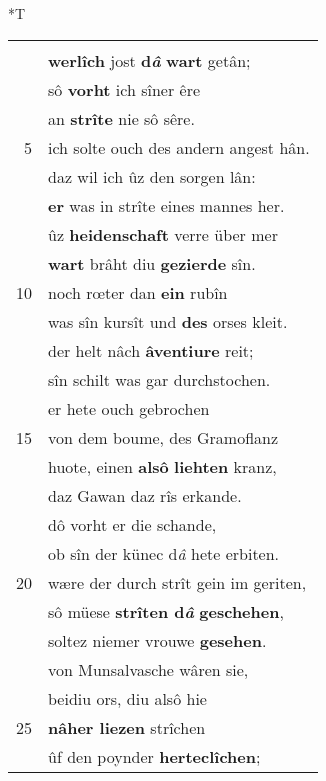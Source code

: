 \documentclass[8pt,a4paper,notitlepage]{article}
\begin{document}
\begin{table}[ht]
\begin{minipage}[t]{0.5\linewidth}
\end{minipage}
\hspace{0.5cm}
\begin{minipage}[t]{0.5\linewidth}
\small
\begin{center}*T
\end{center}
\begin{tabular}{rl}
 & \textbf{\begin{large}A\end{large}ber} von dem werden Gawan\\ 
 & \textbf{werlîch} jost \textbf{d\textit{â}} \textbf{wart} getân;\\ 
 & sô \textbf{vorht} ich sîner êre\\ 
 & an \textbf{strîte} nie sô sêre.\\ 
5 & ich solte ouch des andern angest hân.\\ 
 & daz wil ich ûz den sorgen lân:\\ 
 & \textbf{er} was in strîte eines mannes her.\\ 
 & ûz \textbf{heidenschaft} verre über mer\\ 
 & \textbf{wart} brâht diu \textbf{gezierde} sîn.\\ 
10 & noch rœter dan \textbf{ein} rubîn\\ 
 & was sîn kursît und \textbf{des} orses kleit.\\ 
 & der helt nâch \textbf{âventiure} reit;\\ 
 & sîn schilt was gar durchstochen.\\ 
 & er hete ouch gebrochen\\ 
15 & von dem boume, des Gramoflanz\\ 
 & huote, einen \textbf{alsô} \textbf{liehten} kranz,\\ 
 & daz Gawan daz rîs erkande.\\ 
 & dô vorht er die schande,\\ 
 & ob sîn der künec d\textit{â} hete erbiten.\\ 
20 & wære der durch strît gein im geriten,\\ 
 & sô müese \textbf{strîten d\textit{â}} \textbf{geschehen},\\ 
 & soltez niemer vrouwe \textbf{gesehen}.\\ 
 & von Munsalvasche wâren sie,\\ 
 & beidiu ors, diu alsô hie\\ 
25 & \textbf{nâher liezen} strîchen\\ 
 & ûf den poynder \textbf{herteclîchen};\\ 

\end{tabular}
\end{minipage}
\end{table}
\end{document}
